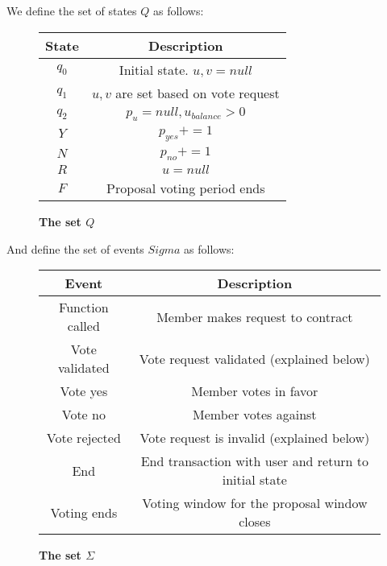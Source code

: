 \documentclass[conference]{IEEEtran}
\begin{document}
We define the set of states $Q$ as follows:
\begin{figure}[h]
\caption{\textbf{The set $Q$}}
\begin{center}
\begin{tabular}{|c|c|}
\hline
State & Description\\
\hline
$q_0$ & Initial state. $u, v = null$\\
\hline
$q_1$ & $u, v$ are set based on vote request\\
\hline
$q_2$ & $p_{u} = null, u_{balance} > 0$\\
\hline
$Y$ & $p_{yes} += 1$ \\
\hline
$N$ & $p_{no} += 1$\\
\hline
$R$ & $u = null$\\
\hline
$F$ & Proposal voting period ends\\
\hline
\end{tabular}
\end{center}
\end{figure}

And define the set of events $Sigma$ as follows:
\begin{figure}[h]
\caption{\textbf{The set $\Sigma$}}
\begin{center}
\begin{tabular}{|c|c|}
\hline
Event & Description\\
\hline
Function called & Member makes request to contract\\
\hline
Vote validated & Vote request validated (explained below)\\
\hline
Vote yes & Member votes in favor \\
\hline
Vote no & Member votes against\\
\hline
Vote rejected & Vote request is invalid (explained below)\\
\hline
End & End transaction with user and return to initial state\\
\hline
Voting ends & Voting window for the proposal window closes\\
\hline
\end{tabular}
\end{center}
\end{figure}
\end{document}
